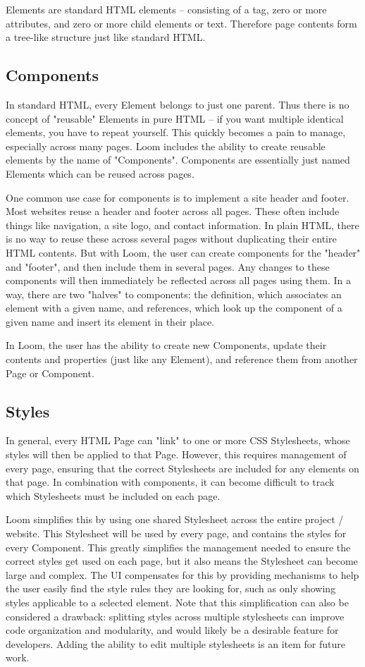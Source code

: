 \documentclass[conference, letterpaper]{IEEEtran}
\begin{document}
Elements are standard HTML elements -- consisting of a tag, zero or more attributes, and zero or more child elements or text. Therefore page contents form a tree-like structure just like standard HTML.

\subsection{Components}
In standard HTML, every Element belongs to just one parent. Thus there is no concept of "reusable" Elements in pure HTML – if you want multiple identical elements, you have to repeat yourself. This quickly becomes a pain to manage, especially across many pages. Loom includes the ability to create reusable elements by the name of "Components". Components are essentially just named Elements which can be reused across pages.

One common use case for components is to implement a site header and footer. Most websites reuse a header and footer across all pages. These often include things like navigation, a site logo, and contact information. In plain HTML, there is no way to reuse these across several pages without duplicating their entire HTML contents. But with Loom, the user can create components for the "header" and "footer", and then include them in several pages. Any changes to these components will then immediately be reflected across all pages using them. In a way, there are two "halves" to components: the definition, which associates an element with a given name, and references, which look up the component of a given name and insert its element in their place.

In Loom, the user has the ability to create new Components, update their contents and properties (just like any Element), and reference them from another Page or Component.

\subsection{Styles}
In general, every HTML Page can "link" to one or more CSS Stylesheets, whose styles will then be applied to that Page. However, this requires management of every page, ensuring that the correct Stylesheets are included for any elements on that page. In combination with components, it can become difficult to track which Stylesheets must be included on each page.

Loom simplifies this by using one shared Stylesheet across the entire project / website. This Stylesheet will be used by every page, and contains the styles for every Component. This greatly simplifies the management needed to ensure the correct styles get used on each page, but it also means the Stylesheet can become large and complex. The UI compensates for this by providing mechanisms to help the user easily find the style rules they are looking for, such as only showing styles applicable to a selected element. Note that this simplification can also be considered a drawback: splitting styles across multiple stylesheets can improve code organization and modularity, and would likely be a desirable feature for developers. Adding the ability to edit multiple stylesheets is an item for future work.
\end{document}
